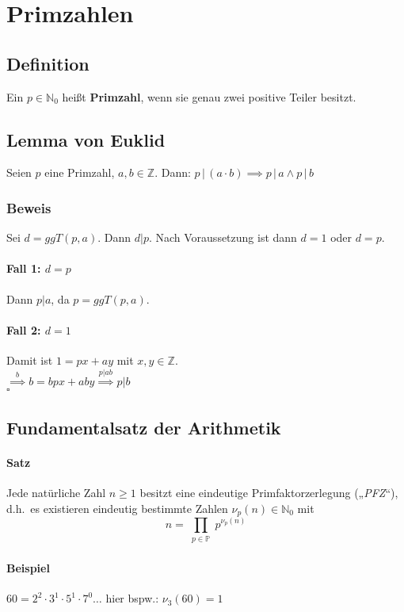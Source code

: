 \documentclass[14pt,a4paper]{article}
\newcommand{\N}{\ensuremath{\mathbb{N}}}
\newcommand{\Z}{\ensuremath{\mathbb{Z}}}
\newcommand{\Nzero}{\ensuremath{\N_0}}
\begin{document}
	\section{Primzahlen}
		\subsection{Definition}
			Ein $p \in \Nzero$ heißt \textbf{Primzahl}, wenn sie genau zwei positive Teiler besitzt.
		\subsection{Lemma von Euklid}
			Seien $p$ eine Primzahl, $a,b \in \Z$. Dann: $ p\,|\,(a \cdot b) \implies p\,|\,a \land p\,|\,b $

			\subsubsection{Beweis}
				Sei $ d = ggT(p,a) $. Dann $ d | p $. Nach Voraussetzung ist dann $ d = 1 $ oder $ d = p $.
				\paragraph{Fall 1: $d = p$}
					Dann $ p | a $, da $ p = ggT(p, a) $.
				\paragraph{Fall 2: $d = 1$}
					Damit ist $ 1 = px + ay $ mit $ x,y \in \Z $. \\
					$ \stackrel{b}{\implies} b = bpx + aby \stackrel{p | ab}{\implies} p | b $\\
					$ \square $
		\subsection{Fundamentalsatz der Arithmetik}
			\paragraph{Satz}
				Jede natürliche Zahl $n \ge 1$ besitzt eine eindeutige Primfaktorzerlegung („\textit{PFZ}“), d.h.\ es existieren eindeutig bestimmte Zahlen $ \nu_{p}(n) \in \Nzero $ mit $$ n = \prod_{\substack{p \in \mathbb{P}}} p^{\nu_{p}(n)}$$
			\paragraph{Beispiel}
				$ 60 = 2^2 \cdot 3^1 \cdot 5^1 \cdot 7^0 \dots $ \; hier bspw.: $ \nu_3(60) = 1 $
\end{document}
